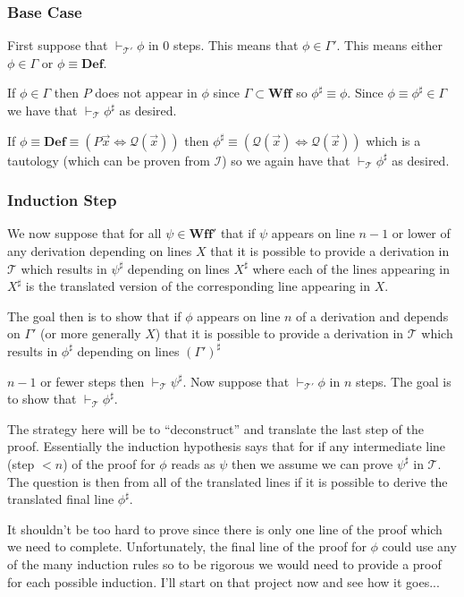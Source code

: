 \documentclass[12pt]{article}
\newcommand{\bv}[1]{\boldsymbol{#1}}
\newcommand{\mc}[1]{\mathcal{#1}}
\newcommand{\bc}[1]{\bv{\mc{#1}}}
\begin{document}
\subsubsection*{Base Case}
First suppose that $\vdash_{\bc{T}'}\phi$ in 0 steps. This means that $\phi \in \Gamma'$. This means either $\phi \in \Gamma$ or $\phi \equiv \textbf{Def}$. 

If $\phi \in \Gamma$ then $P$ does not appear in $\phi$ since $\Gamma \subset \textbf{Wff}$ so $\phi^{\sharp} \equiv \phi$. Since $\phi \equiv \phi^{\sharp} \in \Gamma$ we have that $\vdash_{\bc{T}}\phi^{\sharp}$ as desired.

If $\phi \equiv \textbf{Def} \equiv (P\vec{x} \iff \mc{Q}(\vec{x}))$ then $\phi^{\sharp} \equiv (\mc{Q}(\vec{x}) \iff \mc{Q}(\vec{x}))$ which is a tautology (which can be proven from $\bc{I}$) so we again have that $\vdash_{\bc{T}}\phi^{\sharp}$ as desired.

\subsubsection*{Induction Step}
We now suppose that for all $\psi\in \textbf{Wff}'$ that if $\psi$ appears on line $n-1$ or lower of any derivation depending on lines $X$ that it is possible to provide a derivation in $\bc{T}$ which results in $\psi^{\sharp}$ depending on lines $X^{\sharp}$ where each of the lines appearing in $X^{\sharp}$ is the translated version of the corresponding line appearing in $X$.

The goal then is to show that if $\phi$ appears on line $n$ of a derivation and depends on $\Gamma'$ (or more generally $X$) that it is possible to provide a derivation in $\bc{T}$ which results in $\phi^{\sharp}$  depending on lines $(\Gamma')^{\sharp}$

$n-1$ or fewer steps then $\vdash_{\bc{T}}\psi^{\sharp}$. Now suppose that $\vdash_{\bc{T}'}\phi$ in $n$ steps. The goal is to show that $\vdash_{\bc{T}}\phi^{\sharp}$.

The strategy here will be to ``deconstruct'' and translate the last step of the proof. Essentially the induction hypothesis says that for if any intermediate line (step $<n$) of the proof for $\phi$ reads as $\psi$ then we assume we can prove $\psi^{\sharp}$ in $\bc{T}$. The question is then from all of the translated lines if it is possible to derive the translated final line $\phi^{\sharp}$.

It shouldn't be too hard to prove since there is only one line of the proof which we need to complete. Unfortunately, the final line of the proof for $\phi$ could use any of the many induction rules so to be rigorous we would need to provide a proof for each possible induction. I'll start on that project now and see how it goes...
\end{document}
